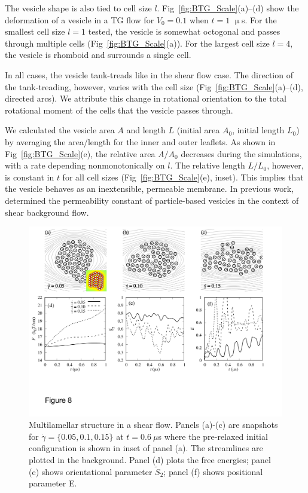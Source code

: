 \documentclass[prb,preprint,showpacs,preprintnumbers,amsmath,amssymb,longbibliography]{revtex4-1}
\begin{document}
The vesicle shape is also tied to cell size $l$.  
Fig~\ref{fig:BTG_Scale}(a)--(d) show the deformation of a vesicle in a
TG flow for $V_0=0.1$ when $t = 1$ $\upmu$s.  
For the smallest cell size $l = 1$ tested, the vesicle is somewhat octogonal
and passes through multiple cells (Fig~\ref{fig:BTG_Scale}(a)).
For the largest cell size $l = 4$,
the vesicle is rhomboid and surrounds a single cell. 

In all cases, the vesicle tank-treads like in the shear flow case.
The direction of the tank-treading, however, varies with the cell
size (Fig~\ref{fig:BTG_Scale}(a)--(d), directed arcs).  We attribute
this change in rotational orientation to the total rotational moment
of the cells that the vesicle passes through.

We calculated the vesicle area $A$ and length $L$ (initial area $A_0$, initial length $L_0$)
by averaging the area/length for the inner and outer leaflets.  
As shown in Fig~\ref{fig:BTG_Scale}(e),
the relative area $A/A_0$ decreases during the simulations, with a rate
depending nonmonotonically on $l$.  
The relative length $L/L_0$, however, is constant in $t$ for all cell sizes (Fig~\ref{fig:BTG_Scale}(e), inset).
This implies that the vesicle behaves as an inextensible, permeable membrane.
In previous work, \cite{Fu2022_JFM} determined the permeability constant of particle-based vesicles
in the context of shear background flow.



\begin{figure}
  \begin{center}
\includegraphics[width=1.0\textwidth]{Figures/Figure8.pdf}
  \end{center}
  \vspace{-20pt}  
  \caption{\label{fig:BC2_shear}
Multilamellar structure in a shear flow. Panels (a)-(c) are snapshots for $\dot \gamma = \{0.05, 0.1, 0.15\}$ at $t=0.6\ \mu$s where the pre-relaxed initial configuration is shown in inset of panel (a). The streamlines are plotted in the background.
Panel (d) plots the free energies; panel (e) shows orientational parameter $\tilde{S}_2$; panel (f) shows positional parameter E.
       }
\end{figure}
\end{document}
